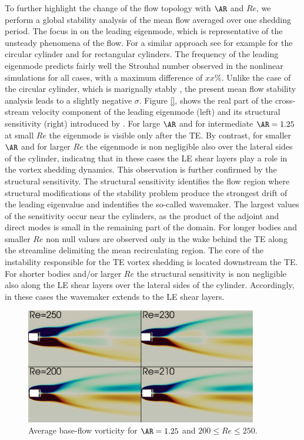 To further highlight the change of the flow topology with $\AR$ and $Re$, we perform a global stability analysis of the mean flow averaged over one shedding period. The focus in on the leading eigenmode, which is representative of the unsteady phenomena of the flow. For a similar approach see for example \cite{pier-2002,barkley-2006} for the circular cylinder and \cite{chiarini-quadrio-auteri-2022} for rectangular cylinders. 
%
The frequency of the leading eigenmode predicts fairly well the Strouhal number observed in the nonlinear simulations for all cases, with a maximum difference of $xx\%$. Unlike the case of the circular cylinder, which is marignally stably \citep{barkley-2006}, the present mean flow stability analysis leads to a slightly negative $\sigma$. Figure \ref{}, shows the real part of the cross-stream velocity component of the leading eigenmode (left) and its structural sensitivity (right) introduced by \cite{giannetti-luchini-2007}. For large $\AR$ and for intermediate $\AR=1.25$ at small $Re$ the eigenmode is visible only after the TE. By contrast, for smaller $\AR$ and for larger $Re$ the eigenmode is non negligible also over the lateral sides of the cylinder, indicatng that in these cases the LE shear layers play a role in the vortex shedding dynamics. This observation is further confirmed by the structural sensitivity. The structural sensitivity identifies the flow region where structural modifications of the stability problem produce the strongest drift of the leading eigenvalue and indentifies the so-called wavemaker. The largest values of the sensitivity occur near the cylinders, as the
product of the adjoint and direct modes is small in the remaining part of the domain. For longer bodies and smaller $Re$ non null values are observed only in the wake behind the TE along the streamline delimiting the mean recirculating region. The core of the instability responsible for the TE vortex shedding is located downstream the TE. For shorter bodies and/or larger $Re$ the structural sensitivity is non negligible also along the LE shear layers over the lateral sides of the cylinder. Accordingly, in these cases the wavemaker extends to the LE shear layers.

\begin{figure}
  \centering
  \includegraphics[width=0.9\textwidth]{./fig/AR1p25/Av_BF_Re200_Re250.png}
  \caption{Average base-flow vorticity for $\AR=1.25$ and $200 \le Re \le 250$.}
  \label{fig:av_bf}
\end{figure}

